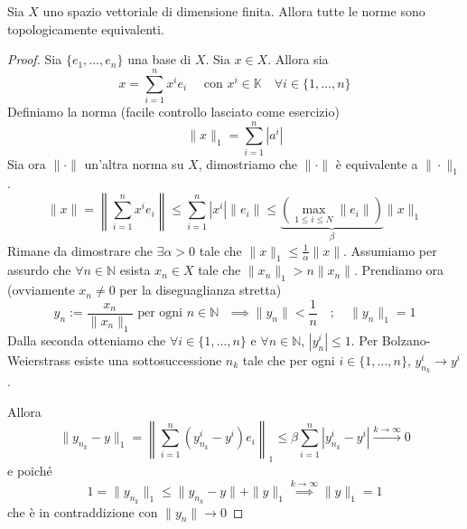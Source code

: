 \begin{theorem}
    Sia \(X\) uno spazio vettoriale di dimensione finita. Allora tutte le norme
    sono topologicamente equivalenti.
\end{theorem}
\begin{proof}{}
    Sia \(\{e_{1}, \dots, e_{n}\} \) una base di \(X\). Sia \(x \in X\). Allora
    sia
    \begin{equation*}
      x = \sum_{i=1}^{n} x^{i}e_{i} \quad \text{ con } x^{i} \in \mathbb{K} \quad \forall i
      \in \{1, \dots, n\}  
    \end{equation*}
    Definiamo la norma (facile controllo lasciato come esercizio)
    \[
      \|x\|_1 = \sum_{i=1}^{n} | a^{i}|  
    \]
    Sia ora \(\|\cdot \|\) un'altra norma su \(X\), dimostriamo che \(\|\cdot \|\) è equivalente a \(\|\cdot \|_1\).
    \begin{equation*}
        \|x\| = \left\| \sum_{i=1}^{n} x^{i}e_{i} \right\| \le \sum_{i=1}^{n} |x^{i}| \|e_{i}\| \le \underbrace{{\left( \max_{1 \le i \le N} \|e_{i}\|  \right)}}_{\beta} \|x\|_1
    \end{equation*}
    Rimane da dimostrare che \(\exists \alpha > 0 \) tale che \(\|x\|_1 \le \frac{1}{\alpha}\|x\|\). Assumiamo per assurdo che \(\forall n \in \mathbb{N}\) esista \(x_{n} \in X\) tale che \(\|x_{n}\|_1 > n \|x_{n}\|\). Prendiamo ora (ovviamente \(x_{n} \neq 0\) per la diseguaglianza stretta)
    \[
      y_{n} := \frac{x_{n}}{\|x_{n}\|_1} \text{ per ogni \(n \in \mathbb{N}\) }
      \implies \|y_{n}\| < \frac{1}{n} \quad ; \quad \|y_n\|_1 = 1
    \]
    Dalla seconda otteniamo che \(\forall i \in \{1, \dots, n\} \) e \(\forall n \in \mathbb{N}\),  \(| y_{n}^{i} | \le 1\). Per Bolzano-Weierstrass esiste una sottosuccessione \(n_k\) tale che per ogni \(i \in \{1, \dots, n\} \), \(y_{n_k}^{i} \to y^{i} \).

    Allora
    \[
      \|y_{n_k} -y\|_1 = \left\| \sum_{i=1}^{n} {\left( y_{n_k}^{i} - y^{i} \right)}  e_i \right\|_1 \le \beta \sum_{i=1}^{n} |y_{n_k}^{i} - y^{i}| \overset{k \to \infty}{\longrightarrow} 0
    \]
    e poiché
    \[
      1 = \|y_{n_k} \|_1 \le \|y_{n_k} - y\| + \|y\|_1 \overset{k \to \infty}{\implies } \|y\|_1 = 1
    \]
    che è in contraddizione con \(\|y_{n}\| \to 0\) 
\end{proof}
